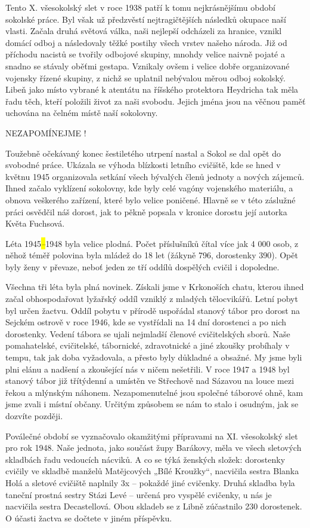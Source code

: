 Tento X. všesokolský slet v roce 1938 patří k tomu nejkrásnějšímu období
sokolské práce. Byl však už předzvěstí nejtragičtějších následků okupace
naší vlasti. Začala druhá světová válka, naši nejlepší odcházeli za
hranice, vznikl domácí odboj a následovaly těžké postihy všech vrstev
našeho národa. Již od příchodu nacistů se tvořily odbojové skupiny,
mnohdy velice naivně pojaté a snadno se stávaly oběťmi gestapa. Vznikaly
ovšem i velice dobře organizované vojensky řízené skupiny, z nichž se
uplatnil nebývalou měrou odboj sokolský. Libeň jako místo vybrané k
atentátu na říšského protektora Heydricha tak měla řadu těch, kteří
položili život za naši svobodu. Jejich jména jsou na věčnou paměť
uchována na čelném místě naší sokolovny.

NEZAPOMÍNEJME !

Toužebně očekávaný konec šestiletého utrpení nastal a Sokol se dal opět
do svobodné práce. Ukázala se výhoda blízkosti letního cvičiště, kde se
hned v květnu 1945 organizovala setkání všech bývalých členů jednoty a
nových zájemců. Ihned začalo vyklízení sokolovny, kde byly celé vagóny
vojenského materiálu, a obnova veškerého zařízení, které bylo velice
poničené. Hlavně se v této záslužné práci osvědčil náš dorost, jak to
pěkně popsala v kronice dorostu její autorka Květa Fuchsová.

Léta 1945\emph{\hl{--}}1948 byla velice plodná. Počet příslušníků čítal
více jak 4 000 osob, z něhož téměř polovina byla mládež do 18 let
(žákyně 796, dorostenky 390). Opět byly ženy v převaze, neboť jeden ze
tří oddílů dospělých cvičil i dopoledne.

Všechna tři léta byla plná novinek. Získali jsme v Krkonoších chatu,
kterou ihned začal obhospodařovat lyžařský oddíl vzniklý z mladých
tělocvikářů. Letní pobyt byl určen žactvu. Oddíl pobytu v přírodě
uspořádal stanový tábor pro dorost na Sejckém ostrově v roce 1946, kde
se vystřídali na 14 dní dorostenci a po nich dorostenky. Vedení tábora
se ujali nejmladší členové cvičitelských sborů. Naše pomahatelské,
cvičitelské, tábornické, zdravotnické a jiné zkoušky probíhaly v tempu,
tak jak doba vyžadovala, a přesto byly důkladné a obsažné. My jsme byli
plni elánu a nadšení a zkoušející nás v ničem nešetřili. V roce 1947 a
1948 byl stanový tábor již třítýdenní a umístěn ve Střechově nad Sázavou
na louce mezi řekou a mlýnským náhonem. Nezapomenutelné jsou společné
táborové ohně, kam jsme zvali i místní občany. Určitým způsobem se nám
to stalo i osudným, jak se dozvíte později.

Poválečné období se vyznačovalo okamžitými přípravami na XI. všesokolský
slet pro rok 1948. Naše jednota, jako součást župy Barákovy, měla ve
všech sletových skladbách řadu vedoucích nácviků. A co se týká ženských
složek: dorostenky cvičily ve skladbě manželů Matějcových „Bílé
Kroužky``, nacvičila sestra Blanka Holá a sletové cvičiště naplnily 3x
-- pokaždé jiné cvičenky. Druhá skladba byla taneční prostná sestry
Stázi Levé -- určená pro vyspělé cvičenky, u nás je nacvičila sestra
Decastellová. Obou skladeb se z Libně zúčastnilo 230 dorostenek. O
účasti žactva se dočtete v jiném příspěvku.

